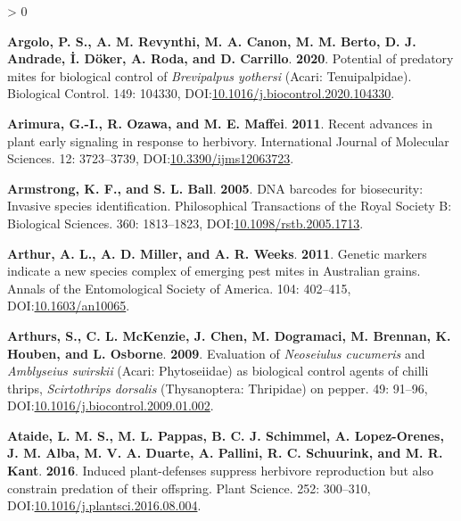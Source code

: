 \documentclass{ufdissertation}[overrideChapters] %
\newlength{\cslhangindent}
\newenvironment{CSLReferences}[2] %
 {%
  \setlength{\parindent}{0pt}
  \ifodd #1 \everypar{\setlength{\hangindent}{\cslhangindent}}\ignorespaces\fi
  \ifnum #2 > 0
  \setlength{\parskip}{#2\baselineskip}
  \fi
 }%
 {}
\begin{document}
{\begin{CSLReferences}{1}{1}
\leavevmode{}%
\textbf{Argolo, P. S., A. M. Revynthi, M. A. Canon, M. M. Berto, D. J. Andrade, İ. Döker, A. Roda, and D. Carrillo}. \textbf{2020}. Potential of predatory mites for biological control of {\emph{Brevipalpus yothersi}} ({Acari}: {Tenuipalpidae}). Biological Control. 149: 104330, DOI:\href{https://doi.org/10.1016/j.biocontrol.2020.104330}{10.1016/j.biocontrol.2020.104330}.

\leavevmode{}%
\textbf{Arimura, G.-I., R. Ozawa, and M. E. Maffei}. \textbf{2011}. Recent advances in plant early signaling in response to herbivory. International Journal of Molecular Sciences. 12: 3723--3739, DOI:\href{https://doi.org/10.3390/ijms12063723}{10.3390/ijms12063723}.

\leavevmode{}%
\textbf{Armstrong, K. F., and S. L. Ball}. \textbf{2005}. {DNA} barcodes for biosecurity: Invasive species identification. Philosophical Transactions of the Royal Society B: Biological Sciences. 360: 1813--1823, DOI:\href{https://doi.org/10.1098/rstb.2005.1713}{10.1098/rstb.2005.1713}.

\leavevmode{}%
\textbf{Arthur, A. L., A. D. Miller, and A. R. Weeks}. \textbf{2011}. Genetic markers indicate a new species complex of emerging pest mites in {Australian} grains. Annals of the Entomological Society of America. 104: 402--415, DOI:\href{https://doi.org/10.1603/an10065}{10.1603/an10065}.

\leavevmode{}%
\textbf{Arthurs, S., C. L. McKenzie, J. Chen, M. Dogramaci, M. Brennan, K. Houben, and L. Osborne}. \textbf{2009}. Evaluation of {\emph{Neoseiulus cucumeris}} and {\emph{Amblyseius swirskii}} ({Acari}: {Phytoseiidae}) as biological control agents of chilli thrips, {\emph{Scirtothrips dorsalis}} ({Thysanoptera}: {Thripidae}) on pepper. 49: 91--96, DOI:\href{https://doi.org/10.1016/j.biocontrol.2009.01.002}{10.1016/j.biocontrol.2009.01.002}.

\leavevmode{}%
\textbf{Ataide, L. M. S., M. L. Pappas, B. C. J. Schimmel, A. Lopez-Orenes, J. M. Alba, M. V. A. Duarte, A. Pallini, R. C. Schuurink, and M. R. Kant}. \textbf{2016}. Induced plant-defenses suppress herbivore reproduction but also constrain predation of their offspring. Plant Science. 252: 300--310, DOI:\href{https://doi.org/10.1016/j.plantsci.2016.08.004}{10.1016/j.plantsci.2016.08.004}.


\end{CSLReferences}}
\end{document}
